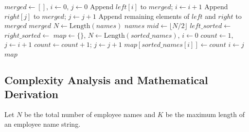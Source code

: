 \begin{algorithm}[H]
\caption{Custom Merge Sort and Duplicate Detection}
\begin{algorithmic}[1]
    \State $merged \gets []$, $i \gets 0$, $j \gets 0$
            \State Append $left[i]$ to $merged$; $i \gets i + 1$
        \Else
            \State Append $right[j]$ to $merged$; $j \gets j + 1$
        \EndIf
    \EndWhile
    \State Append remaining elements of $left$ and $right$ to $merged$
    \State \Return $merged$
\EndFunction
\Statex
{}
    \State $N \gets \text{Length}(names)$
     \Return $names$ \EndIf
    \State $mid \gets \lfloor N / 2 \rfloor$
    \State $left\_sorted \gets$ 
    \State $right\_sorted \gets$ 
    \State \Return {}
\EndFunction
\Statex
{}
    \State $map \gets \{\}$, $N \gets \text{Length}(sorted\_names)$, $i \gets 0$
        \State $count \gets 1$, $j \gets i + 1$
            \State $count \gets count + 1$; $j \gets j + 1$
        \EndWhile
            \State $map[sorted\_names[i]] \gets count$
        \EndIf
        \State $i \gets j$
    \EndWhile
    \State \Return $map$
\EndFunction
\end{algorithmic}
\end{algorithm}

\subsection{Complexity Analysis and Mathematical Derivation}
Let $N$ be the total number of employee names and $K$ be the maximum length of an employee name string.

